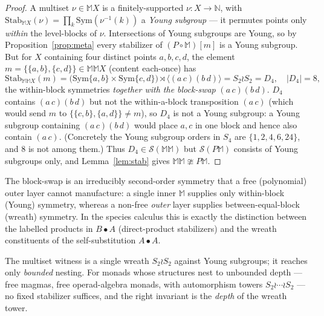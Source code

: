 \documentclass[11pt]{amsart}
\theoremstyle{plain}
\theoremstyle{definition}
\begin{document}
\begin{proof}
A multiset $\nu\in\mathbb MX$ is a finitely-supported $\nu\colon X\to\mathbb N$, with
$\mathrm{Stab}_{\mathbb MX}(\nu)=\prod_k\mathrm{Sym}(\nu^{-1}(k))$ a \emph{Young subgroup} --- it
permutes points only \emph{within} the level-blocks of $\nu$. Intersections of Young subgroups are
Young, so by Proposition~\ref{prop:meta} every stabilizer of $(P\circ\mathbb M)[m]$ is a Young
subgroup. But for $X$ containing four distinct points $a,b,c,d$, the element
$m=\{\{a,b\},\{c,d\}\}\in\mathbb M\mathbb MX$ (content each-once) has
\[
  \mathrm{Stab}_{\mathbb M\mathbb MX}(m)=\bigl(\mathrm{Sym}\{a,b\}\times\mathrm{Sym}\{c,d\}\bigr)\rtimes
  \langle(a\,c)(b\,d)\rangle=S_2\wr S_2=D_4,\quad|D_4|=8,
\]
the within-block symmetries \emph{together with the block-swap} $(a\,c)(b\,d)$. $D_4$ contains
$(a\,c)(b\,d)$ but not the within-a-block transposition $(a\,c)$ (which would send $m$ to
$\{\{c,b\},\{a,d\}\}\ne m$), so $D_4$ is not a Young subgroup: a Young subgroup containing
$(a\,c)(b\,d)$ would place $a,c$ in one block and hence also contain $(a\,c)$. (Concretely the Young
subgroup orders in $S_4$ are $\{1,2,4,6,24\}$, and $8$ is not among them.) Thus $D_4\in\mathcal
S(\mathbb M\mathbb M)$ but $\mathcal S(P\mathbb M)$ consists of Young subgroups only, and
Lemma~\ref{lem:stab} gives $\mathbb M\mathbb M\ncong P\mathbb M$.
\end{proof}

The block-swap is an irreducibly second-order symmetry that a free (polynomial) outer layer cannot
manufacture: a single inner $\mathbb M$ supplies only within-block (Young) symmetry, whereas a
non-free \emph{outer} layer supplies between-equal-block (wreath) symmetry. In the species calculus
this is exactly the distinction between the labelled products in $B\bullet A$ (direct-product
stabilizers) and the wreath constituents of the self-substitution $A\bullet A$.

The multiset witness is a single wreath $S_2\wr S_2$ against Young subgroups; it reaches only
\emph{bounded} nesting. For monads whose structures nest to unbounded depth --- free magmas, free
operad-algebra monads, with automorphism towers $S_2\wr\cdots\wr S_2$ --- no fixed stabilizer suffices,
and the right invariant is the \emph{depth} of the wreath tower.
\end{document}

